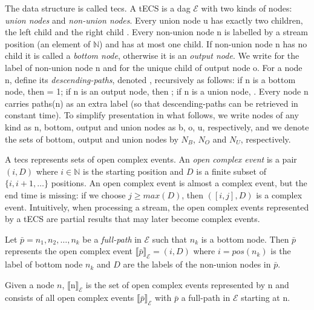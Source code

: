 The data structure is called \acrfull{tecs}. A tECS is a \acrfull{dag} $\mathcal{E}$ with two kinds of nodes: \emph{union nodes} and \emph{non-union nodes}. Every union node \textrm{u} has exactly two children, the left child  and the right child . Every non-union node \textrm{n} is labelled by a stream position (an element of $\mathbb{N}$) and has at most one child. If non-union node \textrm{n} has no child it is called a \emph{bottom node}, otherwise it is an \emph{output node}. We write  for the label of non-union node \textrm{n} and  for the unique child of output node \textrm{o}. For a node \textrm{n}, define its \emph{descending-paths}, denoted , recursively as follows: if \textrm{n} is a bottom node, then  = 1; if \textrm{n} is an output node, then ; if \textrm{n} is a union node, . Every node \textrm{n} carries paths(\textrm{n}) as an extra label (so that descending-paths can be retrieved in constant time). To simplify presentation in what follows, we write nodes of any kind as \textrm{n}, bottom, output and union nodes as \textrm{b, o, u}, respectively, and we denote the sets of bottom, output and union nodes by $N_{B}$, $N_{O}$ and $N_{U}$, respectively.

A \acrshort{tecs} represents sets of open complex events. An \emph{open complex event} is a pair $(i, D)$ where $i \in \mathbb{N}$ is the starting position and $D$ is a finite subset of $\{i, i+1, \ldots\}$ positions. An open complex event is almost a complex event, but the end time is missing: if we choose $j \ge max(D)$, then $([i, j], D)$ is a complex event. Intuitively, when processing a stream, the open complex events represented by a tECS are partial results that may later become complex events.

Let $\bar{p} = n_{1}, n_{2}, \ldots, n_{k}$ be a \emph{full-path} in $\mathcal{E}$ such that $n_{k}$ is a bottom node. Then $\bar{p}$ represents the open complex event ${\llbracket \bar{p} \rrbracket}_{\mathcal{E}} = (i, D)$ where $i = pos(n_{k})$ is the label of bottom node $n_{k}$ and $D$ are the labels of the non-union nodes in $\bar{p}$.

Given a node $n$, ${\llbracket \textrm{n} \rrbracket}_{\mathcal{E}}$ is the set of open complex events represented by \textrm{n} and consists of all open complex events ${\llbracket \bar{p} \rrbracket}_{\mathcal{E}}$ with $\bar{p}$ a full-path in $\mathcal{E}$ starting at \textrm{n}.

